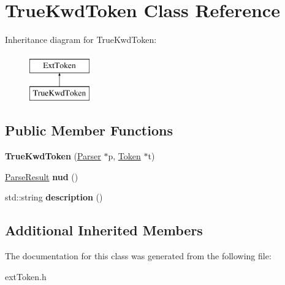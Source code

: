 \hypertarget{classTrueKwdToken}{\section{True\-Kwd\-Token Class Reference}
\label{classTrueKwdToken}
}
Inheritance diagram for True\-Kwd\-Token\-:\begin{figure}[H]
\begin{center}
\leavevmode
\includegraphics[height=2.000000cm]{classTrueKwdToken}
\end{center}
\end{figure}
\subsection*{Public Member Functions}
\begin{DoxyCompactItemize}
\item 
\hypertarget{classTrueKwdToken_aec070f83a6b91ed35a41e24dfd301b17}{{\bfseries True\-Kwd\-Token} (\hyperlink{classParser}{Parser} $\ast$p, \hyperlink{classToken}{Token} $\ast$t)}\label{classTrueKwdToken_aec070f83a6b91ed35a41e24dfd301b17}

\item 
\hypertarget{classTrueKwdToken_ad86f05acb9483438db153eab44aa6dac}{\hyperlink{classParseResult}{Parse\-Result} {\bfseries nud} ()}\label{classTrueKwdToken_ad86f05acb9483438db153eab44aa6dac}

\item 
\hypertarget{classTrueKwdToken_af4dbe740f06e6928a436d06349af67a9}{std\-::string {\bfseries description} ()}\label{classTrueKwdToken_af4dbe740f06e6928a436d06349af67a9}

\end{DoxyCompactItemize}
\subsection*{Additional Inherited Members}


The documentation for this class was generated from the following file\-:\begin{DoxyCompactItemize}
\item 
ext\-Token.\-h\end{DoxyCompactItemize}
